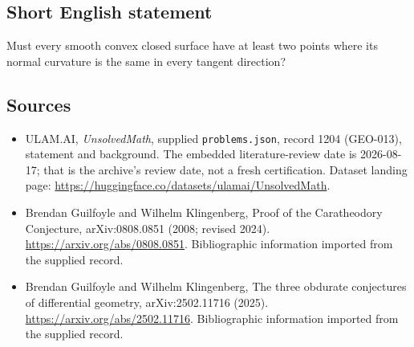 \documentclass[11pt,a4paper]{article}
\begin{document}
\subsection{Short English statement}

Must every smooth convex closed surface have at least two points where its normal curvature is the same in every tangent direction?

\subsection{Sources}

{\small

\begin{itemize}

\item[\hypertarget{source:1204:1}{S1}] ULAM.AI, \emph{UnsolvedMath}, supplied \texttt{problems.json}, record 1204 (GEO-013), statement and background. The embedded literature-review date is 2026-08-17; that is the archive’s review date, not a fresh certification. Dataset landing page: \url{https://huggingface.co/datasets/ulamai/UnsolvedMath}.

\item[\hypertarget{source:1204:2}{S2}] Brendan Guilfoyle and Wilhelm Klingenberg, Proof of the Caratheodory Conjecture, arXiv:0808.0851 (2008; revised 2024). \url{https://arxiv.org/abs/0808.0851}. Bibliographic information imported from the supplied record.

\item[\hypertarget{source:1204:3}{S3}] Brendan Guilfoyle and Wilhelm Klingenberg, The three obdurate conjectures of differential geometry, arXiv:2502.11716 (2025). \url{https://arxiv.org/abs/2502.11716}. Bibliographic information imported from the supplied record.

\end{itemize}

}

\label{end:1204}
\end{document}
